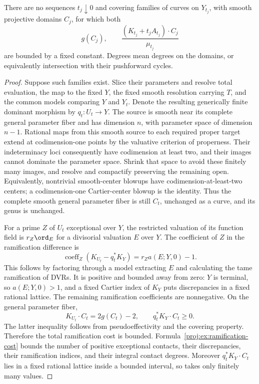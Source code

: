 \begin{proposition}\label{proj:prop:bounded-curves}
There are no sequences \(t_j\downarrow0\) and covering
families of curves on \(Y_{t_j}\), with smooth projective
domains \(C_j\), for which both
\[
 g(C_j),\qquad
 \frac{(K_{t_j}+t_jA_{t_j})\cdot C_j}{\mu_{t_j}}
\]
are bounded by a fixed constant. Degrees mean degrees on
the domains, or equivalently intersection with their
pushforward cycles.
\end{proposition}
\begin{proof}
Suppose such families exist. Slice their parameters and
resolve total evaluation, the map to the fixed \(Y\), the
fixed smooth resolution carrying \(T\), and the common
models comparing \(Y\) and \(Y_t\). Denote the resulting
generically finite dominant morphism by \(q_t:U_t\to Y\).
The source is smooth near its complete general parameter
fiber and has dimension \(n\), with parameter space of
dimension \(n-1\). Rational maps from this smooth source
to each required proper target extend at codimension-one
points by the valuative criterion of properness. Their
indeterminacy loci consequently have codimension at least
two, and their images cannot dominate the parameter space.
Shrink that space to avoid these finitely many images,
and resolve and compactify preserving the remaining open.
Equivalently, nontrivial smooth-center blowups have
codimension-at-least-two centers; a codimension-one
Cartier-center blowup is the identity. Thus the complete
smooth general parameter fiber is still \(C_t\), unchanged
as a curve, and its genus is unchanged.

For a prime \(Z\) of \(U_t\) exceptional over \(Y\), the
restricted valuation of its function field is
\(r_Z\ord_E\) for a divisorial valuation \(E\) over \(Y\).
The coefficient of \(Z\) in the ramification difference is
\begin{equation}\label{proj:ex:ramification-cost}
 \operatorname{coeff}_Z(K_{U_t}-q_t^*K_Y)
       =r_Za(E;Y,0)-1.
\end{equation}
This follows by factoring through a model extracting \(E\)
and calculating the tame ramification of DVRs. It is
positive and bounded away from zero: \(Y\) is terminal,
so \(a(E;Y,0)>1\), and a fixed Cartier index of \(K_Y\)
puts discrepancies in a fixed rational lattice. The
remaining ramification coefficients are nonnegative.
On the general parameter fiber,
\[
 K_{U_t}\cdot C_t=2g(C_t)-2,\qquad
 q_t^*K_Y\cdot C_t\geq0.
 \]
The latter inequality follows from pseudoeffectivity and
the covering property. Therefore the total ramification
cost is bounded. Formula~\eqref{proj:ex:ramification-cost}
bounds the number of positive exceptional contacts,
their discrepancies, their ramification indices, and
their integral contact degrees. Moreover
\(q_t^*K_Y\cdot C_t\) lies in a fixed rational lattice
inside a bounded interval, so takes only finitely many
values.


\end{proof}
